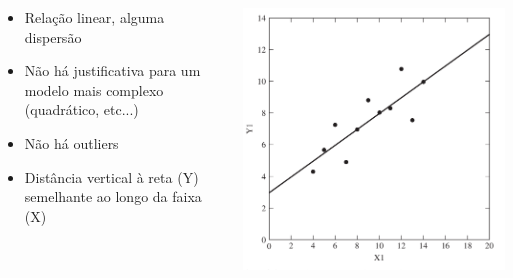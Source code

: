 \documentclass{beamer}
\begin{document}
\begin{frame}{}
  \begin{columns}
    \begin{column}{.5\textwidth}
      \begin{itemize}
        \tiny
      \item<2,3> Relação linear, alguma dispersão
      \item<3> Não há justificativa para um modelo mais complexo (quadrático, etc...)
      \item<4> Não há outliers
      \item<5> Distância vertical à reta (Y) semelhante ao longo da faixa (X)
      \end{itemize}
    \end{column}
    \begin{column}{.5\textwidth}
      \begin{center}
        \includegraphics[width=\textwidth]{EDA/eda-dispersao1}
      \end{center}
    \end{column}
  \end{columns}
\end{frame}
\end{document}
